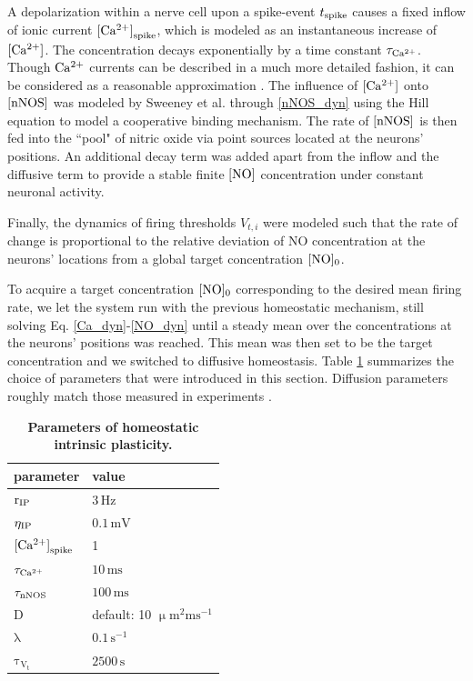 \documentclass[10pt,letterpaper]{article}
\begin{document}
A depolarization within a nerve cell upon a spike-event $t_{\rm spike}$ causes a fixed inflow of ionic current ${\rm [Ca^{2+}]}_{\rm spike}$, which is modeled as an instantaneous increase of $\rm [Ca^{2+}]$. The concentration decays exponentially by a time constant $\tau_{\rm Ca^{2+}}$. Though $\rm Ca^{2+}$ currents can be described in a much more detailed fashion, it can be considered as a reasonable approximation \cite[p.~198-203]{Theor_Neur_Dayan}. The influence of $\rm [Ca^{2+}]$ onto $\rm [nNOS]$ was modeled by Sweeney et al. through \eqref{nNOS_dyn} using the Hill equation \cite{Hill_Equ} to model a cooperative binding mechanism. The rate of $\rm [nNOS]$ is then fed into the ``pool" of nitric oxide via point sources located at the neurons' positions. An additional decay term was added apart from the inflow and the diffusive term to provide a stable finite $\rm [NO]$ concentration under constant neuronal activity.

Finally, the dynamics of firing thresholds $V_{t,i}$ were modeled such that the rate of change is proportional to the relative deviation of NO concentration at the neurons' locations from a global target concentration $\rm [NO]_0$. 

To acquire a target concentration $\rm [NO]_0$ corresponding to the desired mean firing rate, we let the system run with the previous homeostatic mechanism, still solving Eq. \eqref{Ca_dyn}-\eqref{NO_dyn} until a steady mean over the concentrations at the neurons' positions was reached. This mean was then set to be the target concentration and we switched to diffusive homeostasis. Table \ref{Params_IP} summarizes the choice of parameters that were introduced in this section. Diffusion parameters roughly match those measured in experiments \cite{Philippides_2000}.
\begin{table}
\caption{\bf Parameters of homeostatic intrinsic plasticity.}
\begin{tabular}{|l|l|}
\hline
\textbf{parameter} & \textbf{value} \\
\hline
$\mathrm{r_{\rm IP}}$ & $\mathrm{3\,Hz}$ \\
\hline
$\mathrm{\eta_{\rm IP}}$ & $\mathrm{0.1\,mV}$ \\
\hline
${\rm [Ca^{2+}]}_{\rm spike}$ & 1 \\ \hline
$\mathrm{\tau_{\rm Ca^{2+}}}$ &  $\mathrm{10\,ms}$ \\
\hline
$\mathrm{\tau_{\rm nNOS}}$ & $\mathrm{100\,ms}$ \\
\hline
$\mathrm{D}$ & default: 10 $\mathrm{\upmu m^2 ms^{-1}}$ \\
\hline 
$\mathrm{\lambda}$ & $\mathrm{0.1\,s^{-1}}$ \\
\hline
$\mathrm{\tau_{V_t}}$ & $\mathrm{2500\,s}$ \\
\hline
\end{tabular}
\label{Params_IP}
\end{table}
\end{document}
